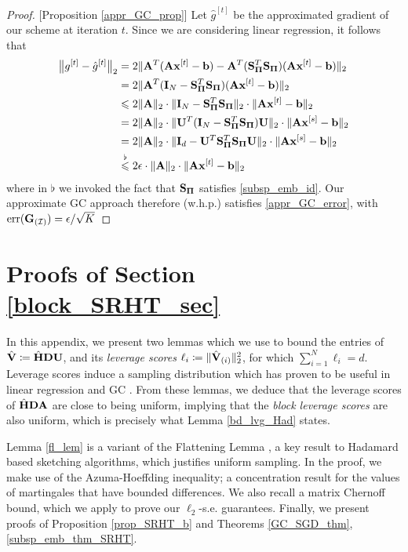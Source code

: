 \documentclass[journal,letterpaper,onecolumn,twoside,nofonttune]{IEEEtran}
\newcommand{\I}{\mathcal{I}}
\newcommand{\Ub}{\bold{U}}
\newcommand{\xb}{\bold{x}}
\newcommand{\Gb}{\bold{G}}
\newcommand{\Pibold}{\bold{\Pi}}
\newcommand{\gh}{\hat{g}}
\newcommand{\Sb}{\bold{S}}
\newcommand{\SbPi}{\Sb_{\Pibold}}
\newcommand{\Ab}{\bold{A}}
\newcommand{\bb}{\bold{b}}
\newcommand{\Db}{\bold{D}}
\newcommand{\Ib}{\bold{I}}
\newcommand{\Hbh}{\hat{\bold{H}}}
\newcommand{\Vbh}{\hat{\bold{V}}}
\newcommand{\err}{\mathrm{err}}
\begin{document}
\begin{proof}{[Proposition \ref{appr_GC_prop}]}
Let $\gh^{[t]}$ be the approximated gradient of our scheme at iteration $t$. Since we are considering linear regression, it follows that
\begin{align*}
  \big\|g^{[t]}-\gh^{[t]}\big\|_2 &= 2\|\Ab^T(\Ab\xb^{[t]}-\bb)-\Ab^T(\SbPi^T\SbPi)(\Ab\xb^{[t]}-\bb)\|_2 \\
  &= 2\|\Ab^T(\Ib_N-\SbPi^T\SbPi)(\Ab\xb^{[t]}-\bb)\|_2\\
  &\leqslant 2\|\Ab\|_2\cdot\|\Ib_N-\SbPi^T\SbPi\|_2\cdot\|\Ab\xb^{[t]}-\bb\|_2\\
  &= 2\|\Ab\|_2\cdot\|\Ub^T(\Ib_N-\SbPi^T\SbPi)\Ub\|_2\cdot\|\Ab\xb^{[s]}-\bb\|_2\\
  &= 2\|\Ab\|_2\cdot\|\Ib_d-\Ub^T\SbPi^T\SbPi\Ub\|_2\cdot\|\Ab\xb^{[s]}-\bb\|_2\\
  &\overset{\flat}{\leqslant} 2\epsilon\cdot\|\Ab\|_2\cdot\|\Ab\xb^{[t]}-\bb\|_2
\end{align*}
where in $\flat$ we invoked the fact that $\SbPi$ satisfies \eqref{subsp_emb_id}. Our approximate GC approach therefore (w.h.p.) satisfies \eqref{appr_GC_error}, with $\err(\Gb_{(\I)})=\epsilon/\sqrt{K}$
\end{proof}

\section{Proofs of Section \ref{block_SRHT_sec}}

In this appendix, we present two lemmas which we use to bound the entries of $\Vbh\coloneqq\Hbh\Db\Ub$, and its \textit{leverage scores} $\ell_i\coloneqq\|\Vbh_{(i)}\|_2^2$, for which $\sum_{i=1}^N\ell_i=d$. Leverage scores induce a sampling distribution which has proven to be useful in linear regression \cite{DMMW12,Woo14,Mah16,Wan15} and GC \cite{CPH20a}. From these lemmas, we deduce that the leverage scores of $\Hbh\Db\Ab$ are close to being uniform, implying that the \textit{block leverage scores}\cite{OJXE18,CPH20a} are also uniform, which is precisely what Lemma \ref{bd_lvg_Had} states.

Lemma \ref{fl_lem} is a variant of the Flattening Lemma \cite{AC06,Mah16}, a key result to Hadamard based sketching algorithms, which justifies uniform sampling. In the proof, we make use of the Azuma-Hoeffding inequality; a concentration result for the values of martingales that have bounded differences. We also recall a matrix Chernoff bound, which we apply to prove our $\ell_2$-s.e. guarantees. Finally, we present proofs of Proposition \ref{prop_SRHT_b} and Theorems \ref{GC_SGD_thm}, \ref{subsp_emb_thm_SRHT}.
\end{document}
